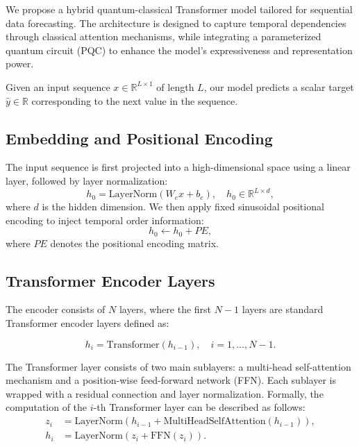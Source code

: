 \documentclass[conference]{IEEEtran}
\begin{document}
We propose a hybrid quantum-classical Transformer model tailored for sequential data forecasting. The architecture is designed to capture temporal dependencies through classical attention mechanisms, while integrating a parameterized quantum circuit (PQC) to enhance the model's expressiveness and representation power.

Given an input sequence $x \in \mathbb{R}^{L \times 1}$ of length $L$, our model predicts a scalar target $\hat{y} \in \mathbb{R}$ corresponding to the next value in the sequence.

\subsection{Embedding and Positional Encoding}

The input sequence is first projected into a high-dimensional space using a linear layer, followed by layer normalization:
\begin{equation}
h_0 = \text{LayerNorm}(W_e x + b_e), \quad h_0 \in \mathbb{R}^{L \times d},
\end{equation}
where $d$ is the hidden dimension. We then apply fixed sinusoidal positional encoding to inject temporal order information:
\begin{equation}
h_0 \leftarrow h_0 + PE,
\end{equation}
where $PE$ denotes the positional encoding matrix.

\subsection{Transformer Encoder Layers}

The encoder consists of $N$ layers, where the first $N-1$ layers are standard Transformer encoder layers defined as:

\begin{equation}
h_i = \text{Transformer}(h_{i-1}), \quad i = 1, \dots, N-1.
\end{equation}

The Transformer layer consists of two main sublayers: a multi-head self-attention mechanism and a position-wise feed-forward network (FFN). Each sublayer is wrapped with a residual connection and layer normalization. Formally, the computation of the $i$-th Transformer layer can be described as follows:
\begin{align}
z_i &= \text{LayerNorm}\left(h_{i-1} + \text{MultiHeadSelfAttention}(h_{i-1})\right), \\
h_i &= \text{LayerNorm}\left(z_i + \text{FFN}(z_i)\right).
\end{align}
\end{document}
